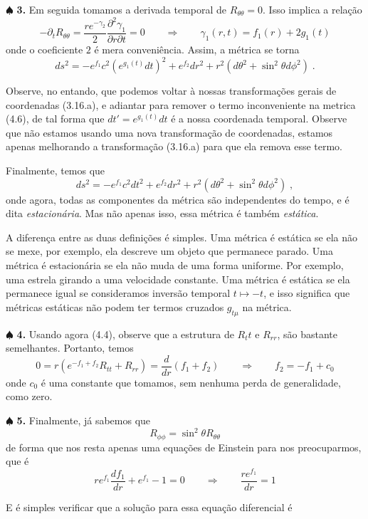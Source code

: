 \documentclass[11pt]{article}
\begin{document}
    \(\spadesuit\) \textbf{3.} Em seguida tomamos a derivada temporal de
\(R_{\theta\theta} = 0\). Isso implica a relação
\[\tag{4.5} -\partial_t R_{\theta\theta} = \frac{r e^{-\gamma_2}}{2}\frac{\partial^2 \gamma_1}{\partial r \partial t} = 0 \qquad \Rightarrow \qquad \gamma_1(r,t)=f_1(r) + 2g_1(t)\]
onde o coeficiente \(2\) é mera conveniência. Assim, a métrica se torna
\[ \tag{4.6} ds^2 = - e^{f_1} c^2 (e^{g_1(t)}dt)^2 + e^{f_2}dr^2 + r^2 (d\theta^2 + \sin^2\theta d\phi^2)\; .\]

Observe, no entando, que podemos voltar à nossas transformações gerais
de coordenadas (3.16.a), e adiantar para remover o termo inconveniente
na metrica (4.6), de tal forma que \(dt' = e^{g_1(t)}dt\) é a nossa
coordenada temporal. Observe que não estamos usando uma nova
transformação de coordenadas, estamos apenas melhorando a transformação
(3.16.a) para que ela remova esse termo.

Finalmente, temos que
\[ \tag{4.7} ds^2 = - e^{f_1} c^2 dt^2 + e^{f_2}dr^2 + r^2 (d\theta^2 + \sin^2\theta d\phi^2)\; ,\]
onde agora, todas as componentes da métrica são independentes do tempo,
e é dita \emph{estacionária}. Mas não apenas isso, essa métrica é também
\emph{estática}.

A diferença entre as duas definições é simples. Uma métrica é estática
se ela não se mexe, por exemplo, ela descreve um objeto que permanece
parado. Uma métrica é estacionária se ela não muda de uma forma
uniforme. Por exemplo, uma estrela girando a uma velocidade constante.
Uma métrica é estática se ela permanece igual se consideramos inversão
temporal \(t\mapsto -t\), e isso significa que métricas estáticas não
podem ter termos cruzados \(g_{t\mu}\) na métrica.

    \(\spadesuit\) \textbf{4.} Usando agora (4.4), observe que a estrutura
de \(R_tt\) e \(R_{rr}\), são bastante semelhantes. Portanto, temos
\[\tag{4.7} 0 = r(e^{-f_1 + f_2}R_{tt} + R_{rr}) = \frac{d}{dr}(f_1 + f_2)\qquad \Rightarrow \qquad  f_2 = -f_1 + c_0 \]
onde \(c_0\) é uma constante que tomamos, sem nenhuma perda de
generalidade, como zero.

    \(\spadesuit\) \textbf{5.} Finalmente, já sabemos que
\[ \tag{4.8} R_{\phi\phi} = \sin^2 \theta R_{\theta\theta}\] de forma
que nos resta apenas uma equações de Einstein para nos preocuparmos, que
é
\[ \tag{4.9} r e^{f_1} \frac{d f_1}{dr}  + e^{f_1} - 1 = 0 \qquad \Rightarrow \qquad \frac{r e^{f_1}}{dr} = 1  \]

    E é simples verificar que a solução para essa equação diferencial é
\end{document}
